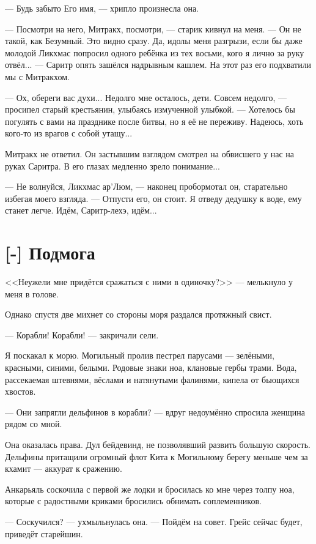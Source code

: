 --- Будь забыто Его имя, --- хрипло произнесла она.

--- Посмотри на него, Митракх, посмотри, --- старик кивнул на меня.
--- Он не такой, как Безумный.
Это видно сразу.
Да, идолы меня разгрызи, если бы даже молодой Ликхмас попросил одного ребёнка из тех восьми, кого я лично за руку отвёл... --- Саритр опять зашёлся надрывным кашлем.
На этот раз его подхватили мы с Митракхом.

--- Ох, обереги вас духи...
Недолго мне осталось, дети.
Совсем недолго, --- просипел старый крестьянин, улыбаясь измученной улыбкой.
--- Хотелось бы погулять с вами на празднике после битвы, но я её не переживу.
Надеюсь, хоть кого-то из врагов с собой утащу...

Митракх не ответил.
Он застывшим взглядом смотрел на обвисшего у нас на руках Саритра.
В его глазах медленно зрело понимание...

--- Не волнуйся, Ликхмас ар’Люм, --- наконец пробормотал он, старательно избегая моего взгляда.
--- Отпусти его, он стоит.
Я отведу дедушку к воде, ему станет легче.
Идём, Саритр-лехэ, идём...

\section{[-] Подмога}

\textspace

<<Неужели мне придётся сражаться с ними в одиночку?>> --- мелькнуло у меня в голове.

Однако спустя две михнет со стороны моря раздался протяжный свист.

--- Корабли! Корабли! --- закричали сели.

Я поскакал к морю.
Могильный пролив пестрел парусами --- зелёными, красными, синими, белыми.
Родовые знаки ноа, клановые гербы трами.
Вода, рассекаемая штевнями, вёслами и натянутыми фалинями, кипела от бьющихся хвостов.

--- Они запрягли дельфинов в корабли? --- вдруг недоумённо спросила женщина рядом со мной.

Она оказалась права.
Дул бейдевинд, не позволявший развить большую скорость.
Дельфины притащили огромный флот Кита к Могильному берегу меньше чем за кхамит --- аккурат к сражению.

Анкарьяль соскочила с первой же лодки и бросилась ко мне через толпу ноа, которые с радостными криками бросились обнимать соплеменников.

--- Соскучился? --- ухмыльнулась она.
--- Пойдём на совет.
Грейс сейчас будет, приведёт старейшин.

